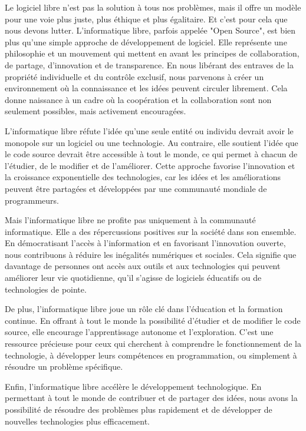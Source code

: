Le logiciel libre n'est pas la solution à tous nos problèmes, mais il offre un modèle pour une voie plus juste, plus éthique et plus égalitaire. Et c'est pour cela que nous devons lutter.
L'informatique libre, parfois appelée "Open Source", est bien plus qu'une simple approche de développement de logiciel. Elle représente une philosophie et un mouvement qui mettent en avant les principes de collaboration, de partage, d'innovation et de transparence. En nous libérant des entraves de la propriété individuelle et du contrôle exclusif, nous parvenons à créer un environnement où la connaissance et les idées peuvent circuler librement. Cela donne naissance à un cadre où la coopération et la collaboration sont non seulement possibles, mais activement encouragées.

L'informatique libre réfute l'idée qu'une seule entité ou individu devrait avoir le monopole sur un logiciel ou une technologie. Au contraire, elle soutient l'idée que le code source devrait être accessible à tout le monde, ce qui permet à chacun de l'étudier, de le modifier et de l'améliorer. Cette approche favorise l'innovation et la croissance exponentielle des technologies, car les idées et les améliorations peuvent être partagées et développées par une communauté mondiale de programmeurs.

Mais l'informatique libre ne profite pas uniquement à la communauté informatique. Elle a des répercussions positives sur la société dans son ensemble. En démocratisant l'accès à l'information et en favorisant l'innovation ouverte, nous contribuons à réduire les inégalités numériques et sociales. Cela signifie que davantage de personnes ont accès aux outils et aux technologies qui peuvent améliorer leur vie quotidienne, qu'il s'agisse de logiciels éducatifs ou de technologies de pointe. 

De plus, l'informatique libre joue un rôle clé dans l'éducation et la formation continue. En offrant à tout le monde la possibilité d'étudier et de modifier le code source, elle encourage l'apprentissage autonome et l'exploration. C'est une ressource précieuse pour ceux qui cherchent à comprendre le fonctionnement de la technologie, à développer leurs compétences en programmation, ou simplement à résoudre un problème spécifique.

Enfin, l'informatique libre accélère le développement technologique. En permettant à tout le monde de contribuer et de partager des idées, nous avons la possibilité de résoudre des problèmes plus rapidement et de développer de nouvelles technologies plus efficacement. 

